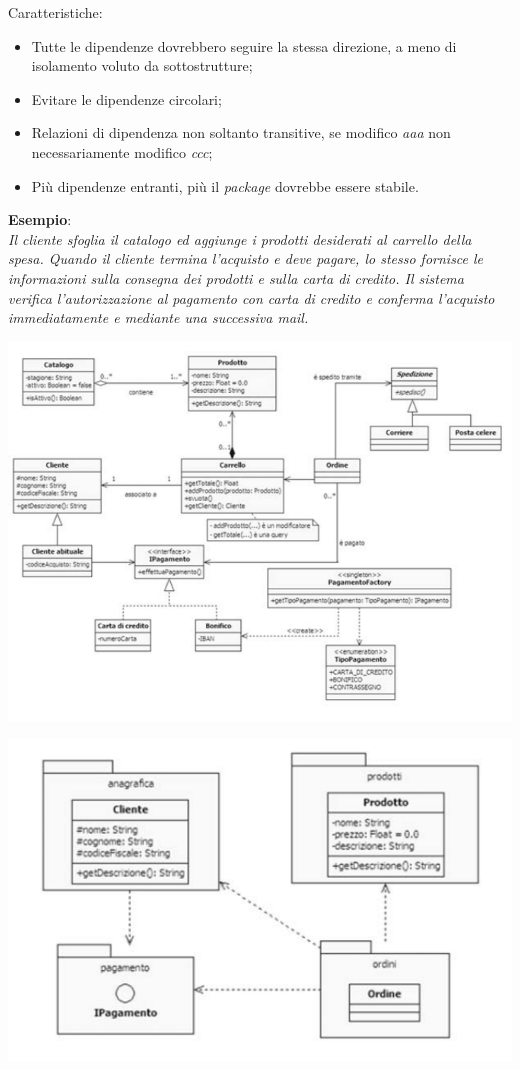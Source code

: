 Caratteristiche:

\begin{itemize}

	\item Tutte le dipendenze dovrebbero seguire la stessa direzione, a meno di isolamento voluto da sottostrutture;
	\item Evitare le dipendenze circolari;
	\item Relazioni di dipendenza non soltanto transitive, se modifico \textit{aaa} non necessariamente modifico \textit{ccc};
	\item Più dipendenze entranti, più il \textit{package} dovrebbe essere stabile.

\end{itemize}

\textbf{Esempio}:\\
\textit{Il cliente sfoglia il catalogo ed aggiunge i prodotti desiderati al carrello della spesa. Quando il cliente termina l’acquisto e deve pagare, lo stesso fornisce le informazioni sulla consegna dei prodotti e sulla carta di credito. Il sistema verifica l’autorizzazione al pagamento con carta di credito e conferma l’acquisto immediatamente e mediante una successiva mail.
}

\begin{center}

\includegraphics[width=0.75\columnwidth]{img4} %

\end{center}

\begin{center}

\includegraphics[width=0.75\columnwidth]{img5} %

\end{center}


